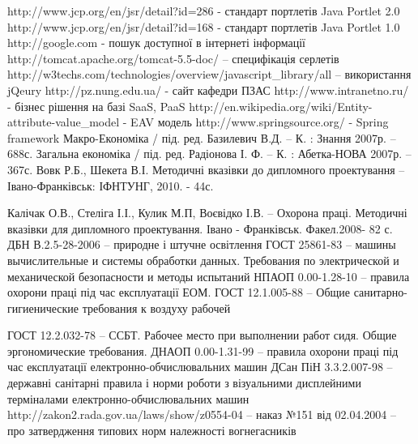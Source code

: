 \renewcommand{\refname}{СПИСОК ПОСИЛАНЬ НА ДЖЕРЕЛА}
\begin{thebibliography}{99}
 http://www.jcp.org/en/jsr/detail?id=286 - стандарт портлетів Java Portlet 2.0
 http://www.jcp.org/en/jsr/detail?id=168 - стандарт портлетів Java Portlet 1.0
 http://google.com - пошук доступної в інтернеті інформації
 http://tomcat.apache.org/tomcat-5.5-doc/ -- специфікація серлетів
 http://w3techs.com/technologies/overview/javascript\_library/all -- використання jQeury
 http://pz.nung.edu.ua/ - сайт кафедри ПЗАС
 http://www.intranetno.ru/ - бізнес рішення на базі SaaS, PaaS
 http://en.wikipedia.org/wiki/Entity-attribute-value\_model - EAV модель
\bibitem{} http://www.springsource.org/ - Spring framework
\bibitem{} Макро-Економіка / під. ред. Базилевич В.Д. -- К. :  Знання 2007р. – 688с.
\bibitem{} Загальна економіка / під. ред. Радіонова І. Ф. -- К. :  Абетка-НОВА  2007р. – 367с.
\bibitem{}  Вовк Р.Б., Шекета В.І. Методичні вказівки до дипломного проектування – Івано-Франківськ: ІФНТУНГ, 2010. - 44с.

\bibitem{}  Калічак О.В., Стеліга І.І., Кулик М.П, Воєвідко І.В. -- Охорона праці. Методичні вказівки для дипломного проектування. Івано - Франківськ. Факел.2008- 82 с.
 ДБН В.2.5-28-2006 -- природне і штучне освітлення
 ГОСТ 25861-83 -- машины вычислительные и системы обработки данных. Требования по электрической и механической безопасности и методы испытаний
 НПАОП 0.00-1.28-10 -- правила охорони праці під час експлуатації ЕОМ.
 ГОСТ 12.1.005-88 -- Общие санитарно-гигиенические требования к воздуху рабочей

 ГОСТ 12.2.032-78 -- ССБТ. Рабочее место при выполнении работ сидя. Общие эргономические требования.
 ДНАОП 0.00-1.31-99 -- правила охорони праці під час експлуатації електронно-обчислювальних машин
 ДСан ПіН 3.3.2.007-98 -- державні санітарні правила і норми роботи з візуальними дисплейними терміналами електронно-обчислювальних машин
 http://zakon2.rada.gov.ua/laws/show/z0554-04 -- наказ №151 від 02.04.2004 -- про затвердження типових норм належності вогнегасників 


\end{thebibliography}

